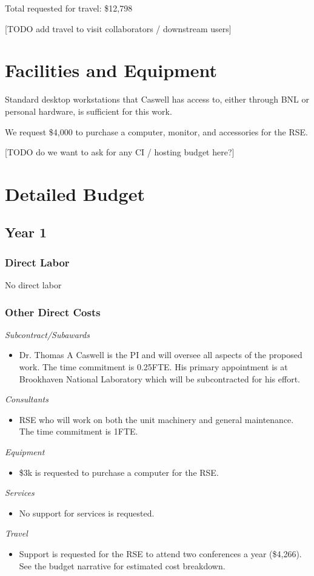 \documentclass[12pt]{article}
\numberwithin{page}{section}
\begin{document}
Total requested for travel: \$12,798

[TODO add travel to visit collaborators / downstream users]

\newpage
\section{Facilities and Equipment}
\setcounter{page}{1}

Standard desktop workstations that Caswell has access to, either
through BNL or personal hardware, is sufficient for this work.

We request \$4,000 to purchase a computer, monitor, and accessories
for the RSE.


[TODO do we want to ask for any CI / hosting budget here?]



\newpage
\section{Detailed Budget}
\setcounter{page}{1}
\subsection{Year 1}
\subsubsection{Direct Labor}
No direct labor
\subsubsection{Other Direct Costs}
\textit{Subcontract/Subawards}
\begin{itemize}
\item Dr. Thomas A Caswell is the PI and will oversee all aspects of the
  proposed work.  The time commitment is 0.25FTE.  His primary
  appointment is at Brookhaven National Laboratory which will be
  subcontracted for his effort.
\end{itemize}
\textit{Consultants}
\begin{itemize}
\item RSE who will work on both the unit machinery and general
  maintenance.  The time commitment is 1FTE.
\end{itemize}
\textit{Equipment}
\begin{itemize}
\item \$3k is requested to purchase a computer for the RSE.
\end{itemize}
\textit{Services}
\begin{itemize}
\item No support for services is requested.
\end{itemize}
\textit{Travel}
\begin{itemize}
\item Support is requested for the RSE to attend two conferences a
  year (\$4,266).  See the budget narrative for estimated cost
  breakdown.
\end{itemize}
\end{document}
